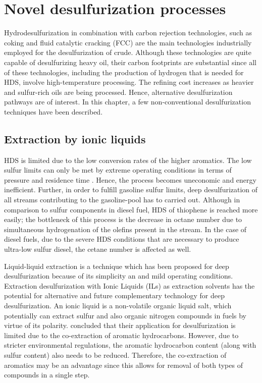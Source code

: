 \chapter{Novel desulfurization processes}
\thispagestyle{plain}

Hydrodesulfurization in combination with carbon rejection technologies, such as coking and fluid catalytic cracking (FCC) are the main technologies industrially employed for the desulfurization of crude. Although these technologies are quite capable of desulfurizing heavy oil, their carbon footprints are substantial since all of these technologies, including the production of hydrogen that is needed for HDS, involve high-temperature processing. The refining cost increases as heavier and sulfur-rich oils are being processed. Hence, alternative desulfurization pathways are of interest. In this chapter, a few non-conventional desulfurization techniques have been described.

\section{Extraction by ionic liquids}

HDS is limited due to the low conversion rates of the higher aromatics. The low sulfur limits can only be met by extreme operating conditions in terms of pressure and residence time \citep{C1GC15196G}. Hence, the process becomes uneconomic and energy inefficient. Further, in order to fulfill gasoline sulfur limits, deep desulfurization of all streams contributing to the gasoline-pool has to carried out. Although in comparison to sulfur components in diesel fuel, HDS of thiophene is reached more easily; the bottleneck of this process is the decrease in octane number due to simultaneous hydrogenation of the olefins present in the stream. In the case of diesel fuels, due to the severe HDS conditions that are necessary to produce ultra-low sulfur diesel, the cetane number is affected as well.

Liquid-liquid extraction is a technique which has been proposed for deep desulfurization because of its simplicity an and mild operating conditions. Extraction desulfurization with Ionic Liquids (ILs) as extraction solvents has the potential for alternative and future complementary technology for deep desulfurization. An ionic liquid is a non-volatile organic liquid salt, which potentially can extract sulfur and also organic nitrogen compounds in fuels by virtue of its polarity. \cite{Ito2006446} concluded that their application for desulfurization is limited due to the co-extraction of aromatic hydrocarbons. However, due to stricter environmental regulations, the aromatic hydrocarbon content (along with sulfur content) also needs to be reduced. Therefore, the co-extraction of aromatics may be an advantage since this allows for removal of both types of compounds in a single step.

